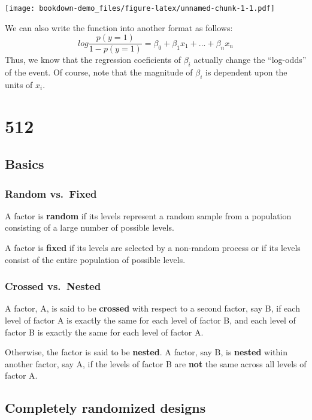 \documentclass[]{book}
\begin{document}
\texttt{[image: bookdown-demo\_files/figure-latex/unnamed-chunk-1-1.pdf]}

We can also write the function into another format as follows:
\[log \frac{p(y=1)}{1-p(y=1)}= \beta_0+\beta_1x_1+...+\beta_nx_n\]
Thus, we know that the regression coeficients of \(\beta_i\) actually change the ``log-odds'' of the event. Of course, note that the magnitude of \(\beta_i\) is dependent upon the units of \(x_i\).

\hypertarget{section-3}{%
\chapter{512}\label{section-3}}

\hypertarget{basics}{%
\section{Basics}\label{basics}}

\hypertarget{random-vs.-fixed}{%
\subsection{Random vs.~Fixed}\label{random-vs.-fixed}}

A factor is \textbf{random} if its levels represent a random sample from a population consisting of a large number of possible levels.

A factor is \textbf{fixed} if its levels are selected by a non-random process or if its levels consist of the entire population of possible levels.

\hypertarget{crossed-vs.-nested}{%
\subsection{Crossed vs.~Nested}\label{crossed-vs.-nested}}

A factor, A, is said to be \textbf{crossed} with respect to a second factor, say B, if each level of factor A is exactly the same for each level of factor B, and each level of factor B is exactly the same for each level of factor A.

Otherwise, the factor is said to be \textbf{nested}. A factor, say B, is \textbf{nested} within another factor, say A, if the levels of factor B are \textbf{not} the same across all levels of factor A.

\hypertarget{completely-randomized-designs}{%
\section{Completely randomized designs}\label{completely-randomized-designs}}
\end{document}

